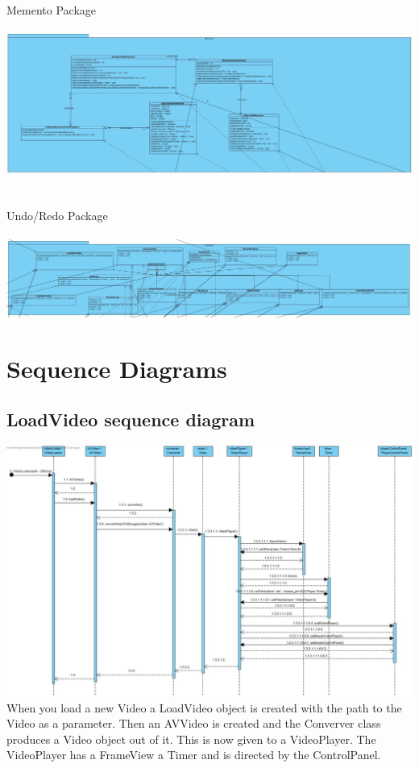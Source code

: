 \documentclass[twoside]{book}
\newcommand{\+}{\discretionary{\mbox{\scriptsize$\hookleftarrow$}}{}{}}
\begin{document}
\newpage
Memento Package\\\\
{\centering\includegraphics[width=1\textwidth]{Memento.jpg}}\\\\\\
Undo/Redo Package\\\\
{\centering\includegraphics[width=1\textwidth]{UndoRedo.jpg}}\\
\newpage
\section{Sequence Diagrams}
\subsection*{LoadVideo sequence diagram}
{\centering\includegraphics[width=1\textwidth]{SequenceDiagram1.jpg}}\\
When you load a new Video a LoadVideo object is created with the path to the Video as a parameter. Then an AVVideo is created and the Converver class produces a Video object out of it. This is now given to a VideoPlayer. The VideoPlayer has a FrameView a Timer and is directed by the ControlPanel.
\newpage
\end{document}
